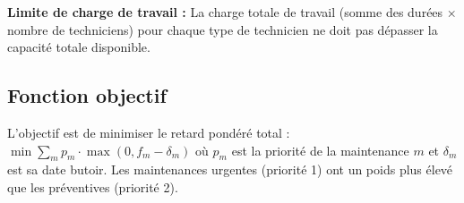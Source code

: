 \textbf{Limite de charge de travail :} La charge totale de travail (somme des durées × nombre de techniciens) pour chaque type de technicien ne doit pas dépasser la capacité totale disponible.

\subsection{Fonction objectif}

L'objectif est de minimiser le retard pondéré total : $\min \sum_{m} p_m \cdot \max(0, f_m - \delta_m)$ où $p_m$ est la priorité de la maintenance $m$ et $\delta_m$ est sa date butoir. Les maintenances urgentes (priorité 1) ont un poids plus élevé que les préventives (priorité 2).
